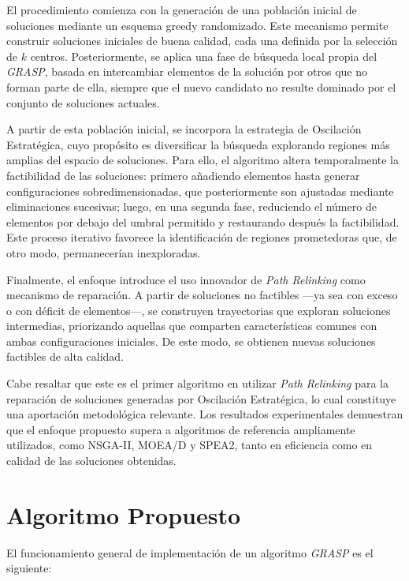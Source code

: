 \documentclass[12pt,a4paper]{book}
\begin{document}
El procedimiento comienza con la generación de una población inicial de soluciones mediante un esquema greedy randomizado. Este mecanismo permite construir soluciones iniciales de buena calidad, cada una definida por la selección de $k$ centros. Posteriormente, se aplica una fase de búsqueda local propia del \textit{GRASP}, basada en intercambiar elementos de la solución por otros que no forman parte de ella, siempre que el nuevo candidato no resulte dominado por el conjunto de soluciones actuales.

A partir de esta población inicial, se incorpora la estrategia de Oscilación Estratégica, cuyo propósito es diversificar la búsqueda explorando regiones más amplias del espacio de soluciones. Para ello, el algoritmo altera temporalmente la factibilidad de las soluciones: primero añadiendo elementos hasta generar configuraciones sobredimensionadas, que posteriormente son ajustadas mediante eliminaciones sucesivas; luego, en una segunda fase, reduciendo el número de elementos por debajo del umbral permitido y restaurando después la factibilidad.
Este proceso iterativo favorece la identificación de regiones prometedoras que, de otro modo, permanecerían inexploradas.

Finalmente, el enfoque introduce el uso innovador de \emph{Path Relinking} como mecanismo de reparación. A partir de soluciones no factibles —ya sea con exceso o con déficit de elementos—, se construyen trayectorias que exploran soluciones intermedias, priorizando aquellas que comparten características comunes con ambas configuraciones iniciales. De este modo, se obtienen nuevas soluciones factibles de alta calidad.

Cabe resaltar que este es el primer algoritmo en utilizar \emph{Path Relinking} para la reparación de soluciones generadas por Oscilación Estratégica, lo cual constituye una aportación metodológica relevante. Los resultados experimentales demuestran que el enfoque propuesto supera a algoritmos de referencia ampliamente utilizados, como NSGA-II, MOEA/D y SPEA2, tanto en eficiencia como en calidad de las soluciones obtenidas.

\section{Algoritmo Propuesto}
El funcionamiento general de implementación de un algoritmo \textit{GRASP} es el siguiente:
\end{document}
